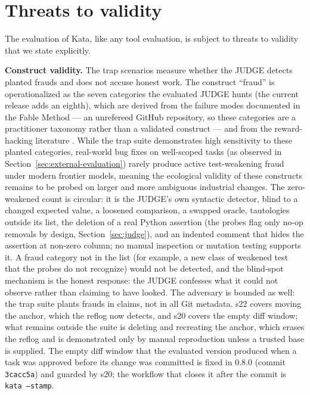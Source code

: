 \documentclass{sbc2019}%
\begin{document}
\section{Threats to validity}
\label{sec:threats}

The evaluation of Kata, like any tool evaluation, is subject to threats to
validity that we state explicitly.

\textbf{Construct validity.} The trap scenarios measure whether the JUDGE
detects planted frauds and does not accuse honest work. The construct
``fraud'' is operationalized as the seven categories the evaluated JUDGE
hunts (the current release adds an eighth), which
are derived from the failure modes documented in the Fable Method
\cite{fable} --- an unrefereed GitHub repository, so these categories are a
practitioner taxonomy rather than a validated construct --- and from the
reward-hacking literature \cite{specbench}. While
the trap suite demonstrates high sensitivity to these planted categories,
real-world bug fixes on well-scoped tasks (as observed in
Section~\ref{sec:external-evaluation}) rarely produce active test-weakening fraud
under modern frontier models, meaning the ecological validity of these constructs
remains to be probed on larger and more ambiguous industrial changes. The
zero-weakened count is circular: it is the JUDGE's own syntactic detector,
blind to a changed expected value, a loosened comparison, a swapped oracle,
tautologies outside its list, the deletion of a real Python assertion
(the probes flag only no-op removals by design, Section~\ref{sec:judge}),
and an indented comment that hides the assertion at non-zero column;
no manual inspection or mutation testing
supports it. A
fraud category not in the list (for example, a new class of weakened test
that the probes do not recognize) would not be detected, and the blind-spot
mechanism is the honest response: the JUDGE confesses what it could not
observe rather than claiming to have looked. The adversary is bounded as
well: the trap suite plants frauds in claims, not in all Git metadata.
s22 covers moving the anchor, which the reflog now detects, and s20 covers
the empty diff window; what remains outside the suite is deleting and
recreating the anchor, which erases the reflog and is demonstrated only by
manual reproduction unless a trusted base is supplied. The empty diff window
that the evaluated version produced when a task was approved before its
change was committed is fixed in 0.8.0 (commit \texttt{3cacc5a}) and guarded
by s20; the workflow that closes it after the commit is
\texttt{kata --stamp}.
\end{document}
